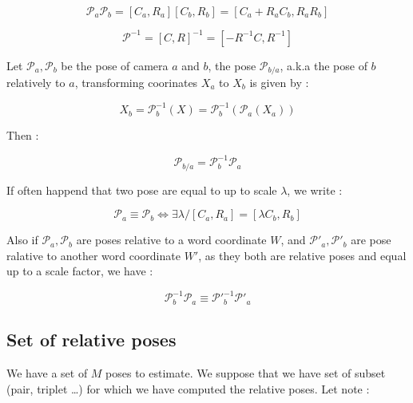 \begin{equation}
    \mathcal{P}_a  \mathcal{P}_b = [C_a,R_a] [C_b,R_b] = [C_a + R_a C_b , R_a R_b]
   \label{PGI:PoseCompos}
\end{equation}

\begin{equation}
    \mathcal{P}^{-1}  = [C,R] ^{-1} = [- R^{-1} C,R^{-1}]
   \label{PGI:PoseInv}
\end{equation}

Let $\mathcal{P}_a,\mathcal{P}_b$ be the pose of camera $a$ and $b$, the pose $\mathcal{P}_{b/a}$,
a.k.a the pose of $b$ relatively to $a$,
transforming coorinates $X_a$ to $X_b$ is given by  :

\begin{equation}
    X_b =  \mathcal{P}^{-1}_b(X) =   \mathcal{P}^{-1}_b(\mathcal{P}_a(X_a))
   \label{PGI:PoseRel}
\end{equation}

Then :

\begin{equation}
    \mathcal{P}_{b/a}  =  \mathcal{P}^{-1}_b \mathcal{P}_a 
   \label{PGI:PoseRel}
\end{equation}

If often happend that two pose are equal to up to scale $\lambda$, we write :

\begin{equation}
    \mathcal{P}_a  \equiv   \mathcal{P}_b  \Leftrightarrow \exists \lambda / [C_a,R_a] = [\lambda  C_b,R_b]
   \label{PGI:PoseRel}
\end{equation}


Also if $\mathcal{P}_a,\mathcal{P}_b$ are poses relative to a word coordinate $W$,
and $\mathcal{P}'_a,\mathcal{P}'_b$  are pose ralative to another word coordinate $W'$,
as they both are relative poses and equal up to a scale factor, we have :

\begin{equation}
     \mathcal{P}_b ^{-1}  \mathcal{P}_a  \equiv \mathcal{P}'^{-1}_b  \mathcal{P}'_a
   \label{PGI:InvarPoseRel}
\end{equation}



\subsection{Set of relative poses}

We have a set of $M$ poses to estimate.
We suppose that we have set of subset (pair, triplet \dots) for which we have computed
the relative poses. Let note :

